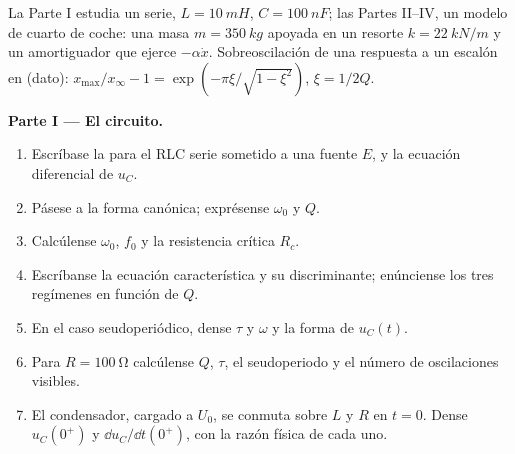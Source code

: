 \begin{problem}
\label{pb:b1:transient-regimes:1}
La Parte I estudia un  serie, $L = \qty{10}{mH}$, $C = \qty{100}{nF}$;
las Partes II--IV, un modelo de cuarto de coche: una masa $m = \qty{350}{kg}$
apoyada en un resorte $k = \qty{22}{kN/m}$ y un amortiguador que ejerce
$-\alpha\dot x$. Sobreoscilación de una respuesta a un escalón en  (dato): $x_{\max}/x_\infty - 1 = \exp(-\pi\xi/\sqrt{1 - \xi^2})$, $\xi = 1/2Q$.

\medskip
\noindent\textbf{Parte I --- El circuito.}
\begin{enumerate}
  \item Escríbase la  para el RLC serie sometido a una
        fuente $E$, y la ecuación diferencial de $u_C$.
  \item Pásese a la forma canónica; exprésense $\omega_0$ y $Q$.
  \item Calcúlense $\omega_0$, $f_0$ y la resistencia crítica $R_c$.
  \item Escríbanse la ecuación característica y su discriminante;
        enúnciense los tres regímenes en función de $Q$.
  \item En el caso seudoperiódico, dense $\tau$ y $\omega$ y la forma de
        $u_C(t)$.
  \item Para $R = \qty{100}{\ohm}$ calcúlense $Q$, $\tau$, el
        seudoperiodo y el número de oscilaciones visibles.
  \item El condensador, cargado a $U_0$, se conmuta sobre $L$ y $R$ en
        $t = 0$. Dense $u_C(0^+)$ y $\dd u_C/\dd t(0^+)$, con la razón
        física de cada uno.
\end{enumerate}


\end{problem}
